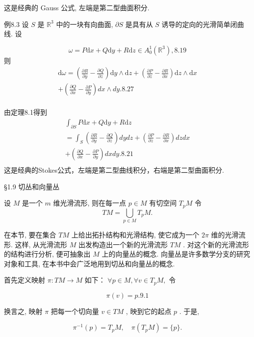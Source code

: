 这是经典的 Gauss 公式, 左端是第二型曲面积分.

例8.3 设  $S$  是  $\mathbb{R}^3$  中的一块有向曲面,  $\partial S$  是具有从  $S$  诱导的定向的光滑简单闭曲线. 设

$$
\omega = P \mathrm {d} x + Q \mathrm {d} y + R \mathrm {d} z \in A _ {0} ^ {1} \left(\mathbb {R} ^ {3}\right),  {8.19}
$$
则
$$
\begin{array}{l} \mathrm {d} \omega = \left(\frac {\partial R}{\partial y} - \frac {\partial Q}{\partial z}\right) \mathrm {d} y \wedge \mathrm {d} z + \left(\frac {\partial P}{\partial z} - \frac {\partial R}{\partial x}\right) \mathrm {d} z \wedge \mathrm {d} x \\ + \left(\frac {\partial Q}{\partial x} - \frac {\partial P}{\partial y}\right) d x \wedge d y.  {8.27} \\ \end{array}
$$

由定理8.1得到
$$
\begin{array}{l} \int_ {\partial S} P \mathrm {d} x + Q \mathrm {d} y + R \mathrm {d} z \\ = \int_ {S} \left(\frac {\partial R}{\partial y} - \frac {\partial Q}{\partial z}\right) d y d z + \left(\frac {\partial P}{\partial z} - \frac {\partial R}{\partial x}\right) d z d x \\ + \left(\frac {\partial Q}{\partial x} - \frac {\partial P}{\partial y}\right) d x d y.  {8.21} \\ \end{array}
$$
这是经典的Stokes公式，左端是第二型曲线积分，右端是第二型曲面积分.

 §1.9 切丛和向量丛

设  $M$  是一个  $m$  维光滑流形, 则在每一点  $p \in M$  有切空间  $T_{p}M$  令
$$
T M = \bigcup_ {p \in M} T _ {p} M.
$$

在本节, 要在集合  $T M$  上给出拓扑结构和光滑结构, 使它成为一个  $2 \pi$  维的光滑流形. 这样, 从光滑流形  $M$  出发构造出一个新的光滑流形  $T M$ . 对这个新的光滑流形的结构进行分析, 便可抽象出  $M$  上的向量丛的概念. 向量丛是许多数学分支的研究对象和工具, 在本书中会广泛地用到切丛和向量丛的概念.

首先定义映射  $\pi :TM\to M$  如下：  $\forall p\in M,\forall v\in T_pM,$  令

$$
\pi (v) = p.  {9.1}
$$

换言之, 映射  $\pi$  把每一个切向量  $v \in TM$ , 映到它的起点  $p$ . 于是,

$$
\pi^ {- 1} (p) = T _ {p} M, \quad \pi (T _ {p} M) = \{p \}.
$$

